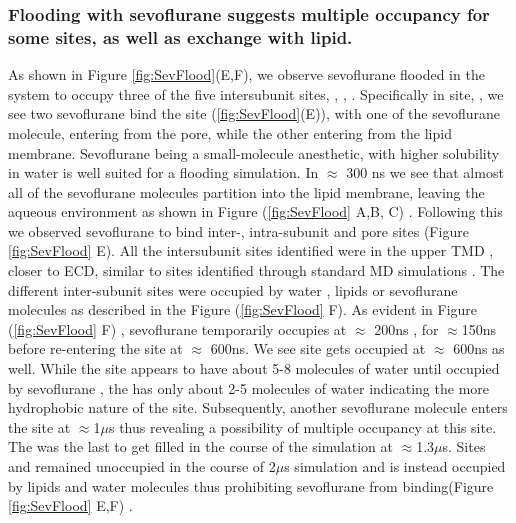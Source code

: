 \documentclass{biophys}
\begin{document}
\subsubsection{Flooding with sevoflurane suggests multiple occupancy for some sites, as well as exchange with lipid.}
As shown in Figure \ref{fig:SevFlood}(E,F), we observe sevoflurane flooded in the system to occupy three of the five intersubunit sites, \gb, \ab, \bag. Specifically in site, \ab, we see two sevoflurane bind the site (\ref{fig:SevFlood}(E)), with one of the sevoflurane molecule, entering from the pore, while the other entering from the lipid membrane.
Sevoflurane being a small-molecule anesthetic, with higher solubility in water  is well suited for a flooding simulation. 
In $\approx$ 300 ns we see that almost all of the sevoflurane molecules partition into the lipid membrane, leaving the aqueous environment  as shown in Figure (\ref{fig:SevFlood} A,B, C) . Following this we observed sevoflurane to bind inter-, intra-subunit and pore sites (Figure \ref{fig:SevFlood} E).
All the intersubunit sites identified were in the upper TMD , closer to ECD, similar to sites identified through standard MD simulations . The different inter-subunit sites were occupied by water , lipids or sevoflurane molecules as described in the Figure (\ref{fig:SevFlood} F).
As evident in Figure (\ref{fig:SevFlood} F) , sevoflurane temporarily occupies \gb at  $\approx$ 200ns , for $\approx$150ns before re-entering the site at $\approx$ 600ns. We see \ab site gets occupied at $\approx$ 600ns as well. While the \gb site appears to have about 5-8 molecules of water  until occupied by sevoflurane , the \ab has only about 2-5 molecules of water indicating the more hydrophobic nature of the site. Subsequently, another sevoflurane molecule enters the \ab site at  $\approx$1$\mu$s thus revealing a possibility of multiple occupancy at this site. The \bag was the last to get filled in the course of the simulation at $\approx$1.3$\mu$s. 
Sites \gba and \ag remained unoccupied in the course of 2$\mu$s simulation and is instead occupied by lipids and water molecules thus prohibiting sevoflurane from binding(Figure \ref{fig:SevFlood} E,F) .
\end{document}
